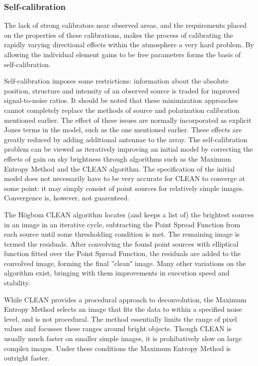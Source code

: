 \documentclass[a4paper,10pt]{report}
\begin{document}
\subsubsection{Self-calibration}
 The lack of strong calibrators near observed areas, and the requirements placed on the properties of these calibrations, makes the process of calibrating the rapidly varying 
 directional effects within the atmosphere a very hard problem. By allowing the individual element gains to be free parameters forms the basis of self-calibration. 

 Self-calibration imposes some restrictions: information about the absolute position, structure and intensity of an observed source is traded
 for improved signal-to-noise ratios. It should be noted that these minimization approaches cannot completely replace the methods of source and polarization calibration mentioned earlier. 
 The effect of these issues are normally incorporated as explicit Jones terms in the model, such as the one mentioned earlier. These effects are greatly reduced by adding additional 
 antennae to the array. The self-calibration problem can be viewed as iteratively improving an initial model by correcting the effects of gain on sky brightness through algorithms such as the Maximum Entropy Method
 and the CLEAN algorithm. The specification of the initial model does not necessarily have to be very accurate for CLEAN to converge at some point: it may simply 
 consist of point sources for relatively simple images. Convergence is, however, not guarenteed.

 The H\"ogbom CLEAN algorithm locates (and keeps a list of) the brightest sources in an image in an iterative cycle, subtracting the Point Spread Function from each source until some 
 thresholding condition is met. The remaining image is termed the residuals. After convolving the found point sources with elliptical function fitted over the Point Spread Function, 
 the residuals are added to the convolved image, forming the final ''clean" image. Many other variations on the algorithm exist, bringing with them improvements in execution speed and 
 stability.

 While CLEAN provides a procedural approach to deconvolution, the Maximum Entropy Method selects an image that fits the data to within a specified noise level, and is not procedural.
 The method essentially limits the range of pixel values and focusses these ranges around bright objects. Though CLEAN is usually much faster on smaller simple images, it is prohibatively slow 
 on large complex images. Under these conditions the Maximum Entropy Method is outright faster.
\end{document}
